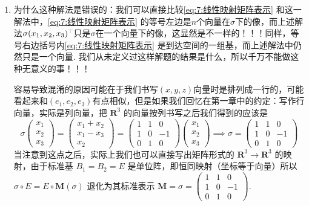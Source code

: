 \begin{enumerate}
    \item 为什么这种解法是错误的：我们可以直接比较\autoref{eq:7:线性映射矩阵表示} 和这一解法中，\autoref*{eq:7:线性映射矩阵表示} 的等号左边是$n$个向量在$\sigma$下的像，而上述解法$\sigma(x_1,x_2,x_3)^{\color{lightgray}\mathrm{T}}$只是$\sigma$在一个向量下的像，这显然是不一样的！！！同样，等号右边括号内\autoref*{eq:7:线性映射矩阵表示} 是到达空间的一组基，而上述解法中仍然只是一个向量. 我们从未定义过这样解题的结果是什么，所以千万不能做这种无意义的事！！！

          容易导致混淆的原因可能在于我们书写$(x,y,z)$向量时是排列成一行的，可能看起来和$(e_1,e_2,e_3)$有点相似，但是如果我们回忆在第一章中的约定：写作行向量，实际是列向量，把 $\mathbf{R}^3$ 的向量按列书写之后我们得到的应该是
          \[
            \sigma\begin{pmatrix}
                x_1 \\ x_2 \\ x_3
            \end{pmatrix} = \begin{pmatrix}
                x_1 + x_2 \\ x_1 - x_3 \\ x_2
            \end{pmatrix} = \begin{pmatrix}
                1 & 1 & 0 \\ 1 & 0 & -1 \\  0 & 1 & 0
            \end{pmatrix} \begin{pmatrix}
                x_1 \\ x_2 \\ x_3
            \end{pmatrix} \implies
            \sigma = \begin{pmatrix}
                1 & 1 & 0 \\ 1 & 0 & -1 \\  0 & 1 & 0
            \end{pmatrix}
          \]
          当注意到这点之后，实际上我们也可以直接写出矩阵形式的 $\mathbf{R}^3 \to \mathbf{R}^3$ 的映射，由于标准基 $B_1 = B_2 = E$ 是单位阵，即恒同映射（坐标等于向量）所以 $\sigma\circ E = E\circ \mathbf{M}(\sigma)$ 退化为其标准表示 $\mathbf{M} = \sigma = \begin{pmatrix}
              1 & 1 & 0 \\ 1 & 0 & -1 \\  0 & 1 & 0
          \end{pmatrix}$.


\end{enumerate}
